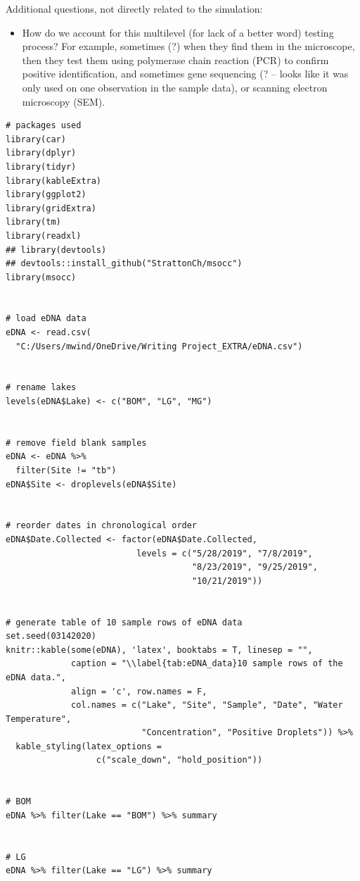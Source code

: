 \documentclass[12pt]{article}\usepackage[]{graphicx}\usepackage[]{color}
\makeatletter
\newenvironment{kframe}{%
 \def\at@end@of@kframe{}%
 \ifinner\ifhmode%
  \def\at@end@of@kframe{\end{minipage}}%
  \begin{minipage}{\columnwidth}%
 \fi\fi%
 \def\FrameCommand##1{\hskip\@totalleftmargin \hskip-\fboxsep
 \colorbox{shadecolor}{##1}\hskip-\fboxsep
     \hskip-\linewidth \hskip-\@totalleftmargin \hskip\columnwidth}%
 \MakeFramed {\advance\hsize-\width
   \@totalleftmargin\z@ \linewidth\hsize
   \@setminipage}}%
 {\par\unskip\endMakeFramed%
 \at@end@of@kframe}
\newenvironment{knitrout}{}{} %
\newenvironment{kframe}{%
 \def\at@end@of@kframe{}%
 \ifinner\ifhmode%
  \def\at@end@of@kframe{\end{minipage}}%
  \begin{minipage}{\columnwidth}%
 \fi\fi%
 \def\FrameCommand##1{\hskip\@totalleftmargin \hskip-\fboxsep
 \colorbox{shadecolor}{##1}\hskip-\fboxsep
     \hskip-\linewidth \hskip-\@totalleftmargin \hskip\columnwidth}%
 \MakeFramed {\advance\hsize-\width
   \@totalleftmargin\z@ \linewidth\hsize
   \@setminipage}}%
 {\par\unskip\endMakeFramed%
 \at@end@of@kframe}
\newenvironment{knitrout}{}{} %
\makeatother
\begin{document}
Additional questions, not directly related to the simulation:
\begin{itemize}
	\item How do we account for this multilevel (for lack of a better word) testing process? For example, sometimes (?) when they find them in the microscope, then they test them using polymerase chain reaction (PCR) to confirm positive identification, and sometimes gene sequencing (? -- looks like it was only used on one observation in the sample data), or scanning electron microscopy (SEM).
\end{itemize}

\singlespacing

\begin{knitrout}
\color{fgcolor}\begin{kframe}
\begin{verbatim}
# packages used 
library(car)
library(dplyr)
library(tidyr)
library(kableExtra)
library(ggplot2)
library(gridExtra)
library(tm)
library(readxl)
## library(devtools)
## devtools::install_github("StrattonCh/msocc")
library(msocc)


# load eDNA data
eDNA <- read.csv(
  "C:/Users/mwind/OneDrive/Writing Project_EXTRA/eDNA.csv")


# rename lakes
levels(eDNA$Lake) <- c("BOM", "LG", "MG")


# remove field blank samples
eDNA <- eDNA %>% 
  filter(Site != "tb")
eDNA$Site <- droplevels(eDNA$Site)


# reorder dates in chronological order
eDNA$Date.Collected <- factor(eDNA$Date.Collected,
                          levels = c("5/28/2019", "7/8/2019", 
                                     "8/23/2019", "9/25/2019",
                                     "10/21/2019"))


# generate table of 10 sample rows of eDNA data
set.seed(03142020)
knitr::kable(some(eDNA), 'latex', booktabs = T, linesep = "",
             caption = "\\label{tab:eDNA_data}10 sample rows of the eDNA data.", 
             align = 'c', row.names = F, 
             col.names = c("Lake", "Site", "Sample", "Date", "Water Temperature", 
                           "Concentration", "Positive Droplets")) %>%
  kable_styling(latex_options = 
                  c("scale_down", "hold_position"))


# BOM
eDNA %>% filter(Lake == "BOM") %>% summary


# LG
eDNA %>% filter(Lake == "LG") %>% summary



\end{verbatim}
\end{kframe}
\end{knitrout}
\end{document}
